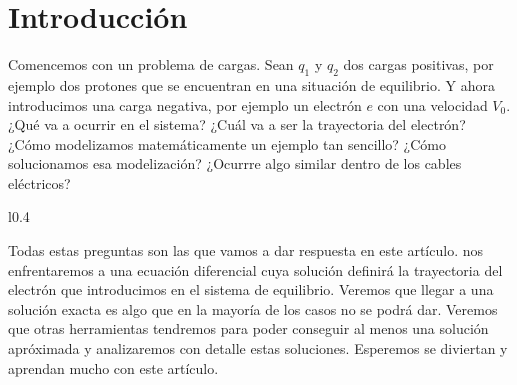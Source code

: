 \section{Introducción}

Comencemos con un problema de cargas. Sean $q_1$ y $q_2$ dos cargas positivas, por ejemplo dos protones que se encuentran en una situación de equilibrio. Y ahora introducimos una carga negativa, por ejemplo un electrón $e$ con una velocidad $V_0$. ¿Qué va a ocurrir en el sistema? ¿Cuál va a ser la trayectoria del electrón? ¿Cómo modelizamos matemáticamente un ejemplo tan sencillo? ¿Cómo solucionamos esa modelización? ¿Ocurrre algo similar dentro de los cables eléctricos?

\begin{wrapfigure}{l}{0.4\textwidth}\vspace{-0.9cm}\begin{center}

\end{center}
\end{wrapfigure}

Todas estas preguntas son las que vamos a dar respuesta en este artículo. nos enfrentaremos a una ecuación diferencial cuya solución definirá la trayectoria del electrón que introducimos en el sistema de equilibrio. Veremos que llegar a una solución exacta es algo que en la mayoría de los casos no se podrá dar. Veremos que otras herramientas tendremos para poder conseguir al menos una solución apróximada y analizaremos con detalle estas soluciones. Esperemos se diviertan y aprendan mucho con este artículo.


